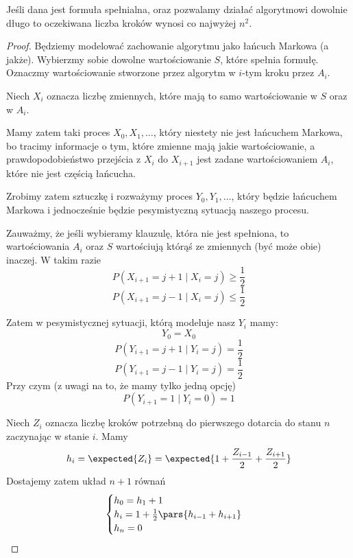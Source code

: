 \begin{theorem}[Lemat 7.1 P\&C]
    Jeśli dana jest formuła spełnialna, oraz pozwalamy działać algorytmowi dowolnie długo 
    to oczekiwana liczba kroków wynosi co najwyżej \( n^2 \).
\end{theorem}
\begin{proof}
    Będziemy modelować zachowanie algorytmu jako łańcuch Markowa (a jakże).
    Wybierzmy sobie dowolne wartościowanie \( S \), które spełnia formułę.
    Oznaczmy wartościowanie stworzone przez algorytm w \(i\)-tym kroku przez \( A_i \).
    
    Niech \( X_i \) oznacza liczbę zmiennych, które mają to samo wartościowanie w \( S \) oraz w \( A_i \).
    
    Mamy zatem taki proces \( X_0, X_1, \dots \), który niestety nie jest łańcuchem Markowa, bo tracimy informacje o tym, które zmienne mają jakie wartościowanie, a prawdopodobieństwo przejścia z \( X_i \) do \( X_{i+1} \) jest zadane wartościowaniem \( A_i \), które nie jest częścią łańcucha.
    
    Zrobimy zatem sztuczkę i rozważymy proces \( Y_0, Y_1, \dots \), który będzie łańcuchem Markowa i jednocześnie będzie pesymistyczną sytuacją naszego procesu.
    
    Zauważmy, że jeśli wybieramy klauzulę, która nie jest spełniona, to wartościowania \( A_i \) oraz \( S \) wartościują którąś ze zmiennych (być może obie) inaczej.
    W takim razie
    \[
        P(X_{i+1} = j + 1 \mid X_i = j) \geq \frac{1}{2}
    \]
    \[
        P(X_{i+1} = j - 1 \mid X_i = j) \leq \frac{1}{2}
    \]
    
    Zatem w pesymistycznej sytuacji, którą modeluje nasz \( Y_i \) mamy:
    \[
        Y_0 = X_0
    \]
    \[
        P(Y_{i+1} = j + 1 \mid Y_i = j) = \frac{1}{2}
    \]
    \[
        P(Y_{i+1} = j - 1 \mid Y_i = j) = \frac{1}{2}
    \]
    Przy czym (z uwagi na to, że mamy tylko jedną opcję)
    \[
        P(Y_{i+1} = 1 \mid Y_i = 0) = 1
    \]
    
    Niech \( Z_i \) oznacza liczbę kroków potrzebną do pierwszego dotarcia do stanu \( n \) zaczynając w stanie \( i \).
    Mamy
    \[
        h_i = \expected{Z_i} = \expected{1 + \frac{Z_{i-1}}{2} + \frac{Z_{i+1}}{2}}
    \]
    Dostajemy zatem układ \( n + 1 \) równań
    \[
        \begin{cases}
            h_0 = h_1 + 1 \\
            h_i = 1 + \frac{1}{2}\pars{h_{i-1} + h_{i+1}} \\
            h_n = 0 
        \end{cases}
    \]
    

\end{proof}
